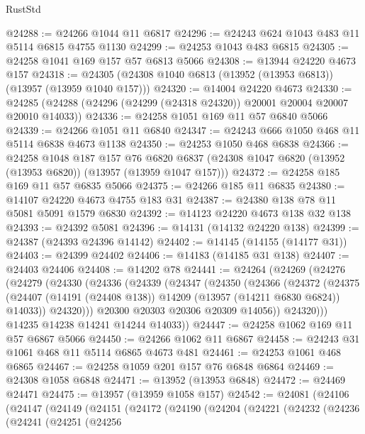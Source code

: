 \begin{lexlean}{RustStd}
\begin{coremodule}
@24288 := @24266 @1044 @11 @6817
@24296 := @24243 @624 @1043 @483 @11 @5114 @6815 @4755 @1130
@24299 := @24253 @1043 @483 @6815
@24305 := @24258 @1041 @169 @157 @57 @6813 @5066
@24308 := @13944 @24220 @4673 @157
@24318 := @24305 (@24308 @1040 @6813 (@13952 (@13953 @6813)) (@13957 (@13959 @1040 @157)))
@24320 := @14004 @24220 @4673
@24330 := @24285 (@24288 (@24296 (@24299 (@24318 @24320)) @20001 @20004 @20007 @20010 @14033))
@24336 := @24258 @1051 @169 @11 @57 @6840 @5066
@24339 := @24266 @1051 @11 @6840
@24347 := @24243 @666 @1050 @468 @11 @5114 @6838 @4673 @1138
@24350 := @24253 @1050 @468 @6838
@24366 := @24258
    @1048
    @187
    @157
    @76
    @6820
    @6837
    (@24308 @1047 @6820 (@13952 (@13953 @6820)) (@13957 (@13959 @1047 @157)))
@24372 := @24258 @185 @169 @11 @57 @6835 @5066
@24375 := @24266 @185 @11 @6835
@24380 := @14107 @24220 @4673 @4755 @183 @31
@24387 := @24380 @138 @78 @11 @5081 @5091 @1579 @6830
@24392 := @14123 @24220 @4673 @138 @32 @138
@24393 := @24392 @5081
@24396 := @14131 (@14132 @24220 @138)
@24399 := @24387 (@24393 @24396 @14142)
@24402 := @14145 (@14155 (@14177 @31))
@24403 := @24399 @24402
@24406 := @14183 (@14185 @31 @138)
@24407 := @24403 @24406
@24408 := @14202 @78
@24441 := @24264
    (@24269
      (@24276
        (@24279
          (@24330
            (@24336
              (@24339
                (@24347
                  (@24350
                    (@24366
                      (@24372
                        (@24375
                          (@24407
                            (@14191 (@24408 @138))
                            @14209
                            (@13957 (@14211 @6830 @6824))
                            @14033))
                        @24320)))
                  @20300
                  @20303
                  @20306
                  @20309
                  @14056))
              @24320)))
        @14235
        @14238
        @14241
        @14244
        @14033))
@24447 := @24258 @1062 @169 @11 @57 @6867 @5066
@24450 := @24266 @1062 @11 @6867
@24458 := @24243 @31 @1061 @468 @11 @5114 @6865 @4673 @481
@24461 := @24253 @1061 @468 @6865
@24467 := @24258 @1059 @201 @157 @76 @6848 @6864
@24469 := @24308 @1058 @6848
@24471 := @13952 (@13953 @6848)
@24472 := @24469 @24471
@24475 := @13957 (@13959 @1058 @157)
@24542 := @24081
    (@24106
      (@24147
        (@24149
          (@24151
            (@24172
              (@24190
                (@24204
                  (@24221
                    (@24232
                      (@24236
                        (@24241
                          (@24251
                            (@24256

\end{coremodule}
\end{lexlean}
